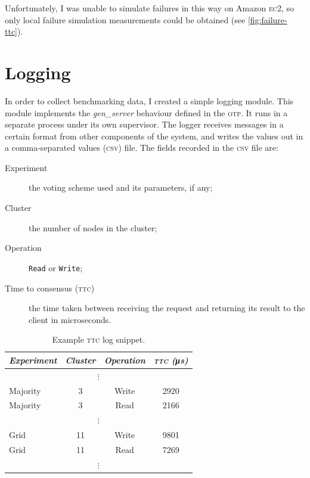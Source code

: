 \documentclass[12pt,chapterprefix=true,toc=bibliography,numbers=noendperiod,
               footnotes=multiple,twoside]{scrreprt}
\newcommand{\ECC}[0]{\textsc{ec}2}
\begin{document}
Unfortunately, I was unable to simulate failures in this way on Amazon \ECC, so only local failure simulation measurements could be obtained (see \cref{fig:failure-ttc}).

\section{Logging}
\label{sc:logging}

In order to collect benchmarking data, I created a simple logging module. This module implements the \emph{gen\_server} behaviour defined in the \textsc{otp}. It runs in a separate process under its own supervisor. The logger receives messages in a certain format from other components of the system, and writes the values out in a comma-separated values (\textsc{csv}) file. The fields recorded in the \textsc{csv} file are:

\begin{description}
    \item[Experiment] the voting scheme used and its parameters, if any;
    \item[Cluster] the number of nodes in the cluster;
    \item[Operation] \texttt{Read} or \texttt{Write};
    \item[Time to consensus (\textsc{ttc})] the time taken between receiving the request and returning its result to the client in microseconds.
\end{description}

\begin{table}[h]
    \centering
    \begin{tabular}{l c c c}
        \toprule
        \textit{Experiment} & \textit{Cluster} & \textit{Operation} & \textit{\textsc{ttc} (\si{\micro\second})} \\
        \midrule
        \multicolumn{4}{c}{\(\vdots\)} \\
        Majority & 3 & Write & 2920 \\
        Majority & 3 & Read & 2166 \\
        \multicolumn{4}{c}{\(\vdots\)} \\
        Grid & 11 & Write & 9801 \\
        Grid & 11 & Read & 7269 \\
        \multicolumn{4}{c}{\(\vdots\)} \\
        \bottomrule
    \end{tabular}
    \caption[Example TTC log snippet]{Example \textsc{ttc} log snippet.}
    \label{tab:csv}
\end{table}
\end{document}
